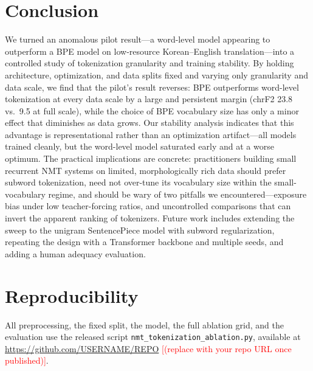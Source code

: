 \documentclass[conference]{IEEEtran}
\newcommand{\PH}[1]{\textcolor{red}{[#1]}}
\begin{document}
\section{Conclusion}
We turned an anomalous pilot result---a word-level model appearing to outperform
a BPE model on low-resource Korean--English translation---into a controlled study
of tokenization granularity and training stability. By holding architecture,
optimization, and data splits fixed and varying only granularity and data scale,
we find that the pilot's result reverses: BPE outperforms word-level tokenization
at every data scale by a large and persistent margin (chrF2 23.8 vs.\ 9.5 at full
scale), while the choice of BPE vocabulary size has only a minor effect that
diminishes as data grows. Our stability analysis indicates that this advantage is
representational rather than an optimization artifact---all models trained
cleanly, but the word-level model saturated early and at a worse optimum. The
practical implications are concrete: practitioners building small recurrent NMT
systems on limited, morphologically rich data should prefer subword tokenization,
need not over-tune its vocabulary size within the small-vocabulary regime, and
should be wary of two pitfalls we encountered---exposure bias under low
teacher-forcing ratios, and uncontrolled comparisons that can invert the apparent
ranking of tokenizers. Future work includes extending the sweep to the unigram
SentencePiece model with subword regularization, repeating the design with a
Transformer backbone and multiple seeds, and adding a human adequacy evaluation.

\section*{Reproducibility}
All preprocessing, the fixed split, the model, the full ablation grid, and the
evaluation use the released script \texttt{nmt\_tokenization\_ablation.py},
available at \url{https://github.com/USERNAME/REPO} \PH{(replace with your repo
URL once published)}.
\end{document}
